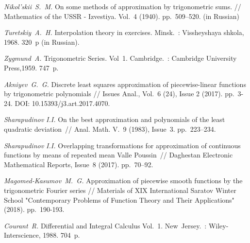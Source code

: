 \begin{thebibliography}{111}
\textit{Nikol'skii~S.~M.} On some methods of approximation by trigonometric sums. // Mathematics of the USSR - Izvestiya. Vol.~4 (1940). pp.~509--520. (in Russian)

\textit{Turetskiy~A.~H.} Interpolation theory in exercises. Minsk.~: Vissheyshaya shkola, 1968. 320~p (in Russian).

\textit{Zygmund~A.} Trigonometric Series. Vol~1. Cambridge.~:
Cambridge University Press,1959. 747~p.	

\textit{Akniyev~G.~G.} Discrete least squares approximation of piecewise-linear functions by trigonometric polynomials // Issues Anal., Vol.~6 (24), Issue 2 (2017). pp.~3-24. DOI: 10.15393/j3.art.2017.4070.

\textit{Sharapudinov I.I.} On the best approximation and polynomials of the least quadratic deviation~// Anal. Math. V.~9 (1983), Issue~3. pp.~223--234.

\textit{Sharapudinov I.I.} Overlapping transformations for approximation of continuous functions by means of repeated mean Valle Poussin~// Daghestan Electronic Mathematical Reports, Issue~8 (2017). pp.~70--92.

\textit{Magomed-Kasumov~M.~G.}
Approximation of piecewise smooth functions by the trigonometric Fourier series //
Materials of XIX International Saratov Winter School "Contemporary Problems of Function Theory and Their Applications" (2018). pp.~190-193.

\textit{Courant~R.} Differential and Integral Calculus Vol.~1. New~Jersey.~:
Wiley-Interscience, 1988. 704~p.



\end{thebibliography}
